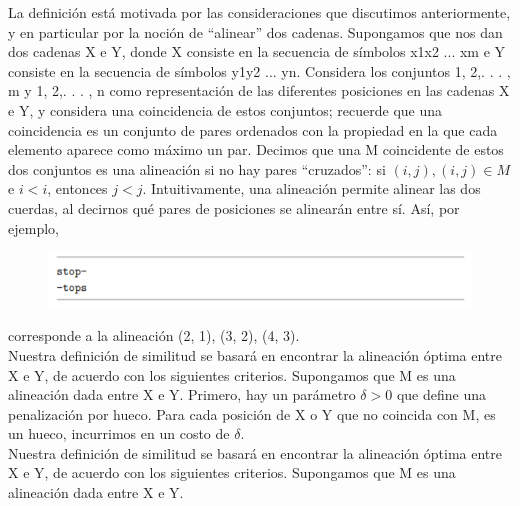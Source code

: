 \documentclass[a4paper, 12pt]{book}
\theoremstyle{dotless}
\begin{document}
La definición está motivada por las consideraciones que discutimos anteriormente, y en particular por la noción de ``alinear'' dos cadenas. Supongamos que nos dan dos cadenas X e Y, donde X consiste en la secuencia de símbolos x1x2 ... xm e Y consiste en la secuencia de símbolos y1y2 ... yn. Considera los conjuntos {1, 2,. . . , m} y {1, 2,. . . , n} como representación de las diferentes posiciones en las cadenas X e Y, y considera una coincidencia de estos conjuntos; recuerde que una coincidencia es un conjunto de pares ordenados con la propiedad en la que cada elemento aparece como máximo un par. Decimos que una M coincidente de estos dos conjuntos es una alineación si no hay pares ``cruzados'': si $(i, j), (i, j)  \in  M$ e $i <i$, entonces $j <j$. Intuitivamente, una alineación permite alinear las dos cuerdas, al decirnos qué pares de posiciones se alinearán entre sí. Así, por ejemplo, \\

\begin{figure}[h]
\centering
\includegraphics[scale=1]{Imagenes-Seccion6/cod6_12.PNG}
\end{figure}

corresponde a la alineación {(2, 1), (3, 2), (4, 3)}.\\

Nuestra definición de similitud se basará en encontrar la alineación óptima entre X e Y, de acuerdo con los siguientes criterios. Supongamos que M es una alineación dada entre X e Y. Primero, hay un parámetro $\delta > 0$ que define una penalización por hueco. Para cada posición de X o Y que no coincida con M, es un hueco, incurrimos en un costo de $\delta$.\\

Nuestra definición de similitud se basará en encontrar la alineación óptima entre X e Y, de acuerdo con los siguientes criterios. Supongamos que M es una alineación dada entre X e Y.\\
\end{document}

